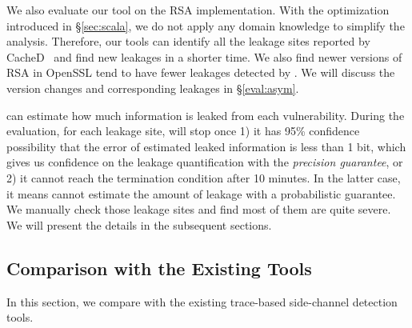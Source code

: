 We also evaluate our tool on the RSA implementation. With the optimization
introduced in \S\ref{sec:scala}, we do not apply any domain knowledge to
simplify the analysis. Therefore, our tools can identify all the leakage sites
reported by CacheD~\cite{203878} and find new leakages in a shorter time. 
We also find newer
versions of RSA in OpenSSL tend to have fewer leakages detected by \tool{}. We
will discuss the version changes and corresponding leakages in \S\ref{eval:asym}.

\tool{} can estimate how
much information is leaked from each vulnerability. During the evaluation,
for each leakage site, \tool{} will stop once 1) it has 95\% confidence
possibility that the error of estimated leaked information is less than 1 bit,
which gives us confidence on the leakage quantification with the \emph{precision guarantee}, 
or 2) it cannot reach the termination condition after 10 minutes. In
the latter case, it means \tool{} cannot estimate the amount of leakage with a
probabilistic guarantee.
\label{loc:timeout}
We manually check those leakage sites and find most of them are quite severe.
We will present the details in the subsequent sections.

\subsection{Comparison with the Existing Tools}
\label{eval:scala}


In this section, we compare \tool{} with the
existing trace-based side-channel detection tools.

